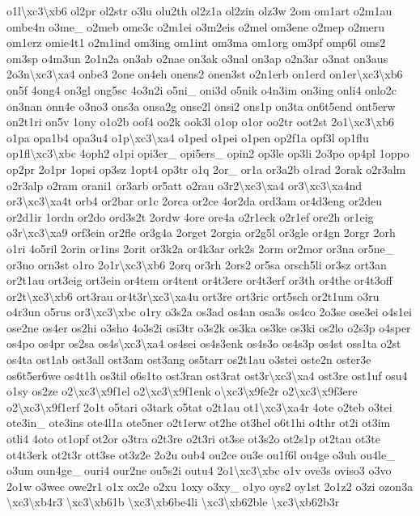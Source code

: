 \begin{DoxyCompactItemize}
o1l\textbackslash{}xc3\textbackslash{}xb6 ol2pr ol2str o3lu olu2th ol2z1a ol2zin olz3w 2om om1art o2m1au ombe4n o3me\-\_\- o2meb ome3c o2m1ei o3m2eis o2mel om3ene o2mep o2meru om1erz omie4t1 o2m1ind om3ing om1int om3ma om1org om3pf omp6l oms2 om3sp o4m3un 2o1n2a on3ab o2nae on3ak o3nal on3ap o2n3ar o3nat on3aus 2o3n\textbackslash{}xc3\textbackslash{}xa4 onbe3 2one on4eh onens2 onen3st o2n1erb on1erd on1er\textbackslash{}xc3\textbackslash{}xb6 on5f 4ong4 on3gl ong5sc 4o3n2i o5ni\-\_\- oni3d o5nik o4n3im on3ing onli4 onlo2c on3nan onn4e o3no3 ons3a onsa2g onse2l onsi2 ons1p on3ta on6t5end ont5erw on2t1ri on5v 1ony o1o2b oof4 oo2k ook3l o1op o1or oo2tr oot2st 2o1\textbackslash{}xc3\textbackslash{}xb6 o1pa opa1b4 opa3u4 o1p\textbackslash{}xc3\textbackslash{}xa4 o1ped o1pei o1pen op2f1a opf3l op1flu op1fl\textbackslash{}xc3\textbackslash{}xbc 4oph2 o1pi opi3er\-\_\- opi5ers\-\_\- opin2 op3le op3li 2o3po op4pl 1oppo op2pr 2o1pr 1opsi op3sz 1opt4 op3tr o1q 2or\-\_\- or1a or3a2b o1rad 2orak o2r3alm o2r3alp o2ram orani1 or3arb or5att o2rau o3r2\textbackslash{}xc3\textbackslash{}xa4 or3\textbackslash{}xc3\textbackslash{}xa4nd or3\textbackslash{}xc3\textbackslash{}xa4t orb4 or2bar or1c 2orca or2ce 4or2da ord3am or4d3eng or2deu or2d1ir 1ordn or2do ord3s2t 2ordw 4ore ore4a o2r1eck o2r1ef ore2h or1eig o3r\textbackslash{}xc3\textbackslash{}xa9 orf3ein or2fle or3g4a 2orget 2orgia or2g5l or3gle or4gn 2orgr 2orh o1ri 4o5ril 2orin or1ins 2orit or3k2a or4k3ar ork2s 2orm or2mor or3na or5ne\-\_\- or3no orn3st o1ro 2o1r\textbackslash{}xc3\textbackslash{}xb6 2orq or3rh 2ors2 or5sa orsch5li or3sz ort3an or2t1au ort3eig ort3ein or4tem or4tent or4t3ere or4t3erf or3th or4the or4t3off or2t\textbackslash{}xc3\textbackslash{}xb6 ort3rau or4t3r\textbackslash{}xc3\textbackslash{}xa4u ort3re ort3ric ort5sch or2t1um o3ru o4r3un o5rus or3\textbackslash{}xc3\textbackslash{}xbc o1ry o3s2a os3ad os4an osa3s os4co 2o3se ose3ei o4s1ei ose2ne os4er os2hi o3sho 4o3s2i osi3tr o3s2k os3ka os3ke os3ki os2lo o2s3p o4sper os4po os4pr os2sa os4s\textbackslash{}xc3\textbackslash{}xa4 os4sei os4s3enk os4s3o os4s3p os4st oss1ta o2st os4ta ost1ab ost3all ost3am ost3ang os5tarr os2t1au o3stei oste2n oster3e os6t5er6we os4t1h os3til o6s1to ost3ran ost3rat ost3r\textbackslash{}xc3\textbackslash{}xa4 ost3re ost1uf osu4 o1sy os2ze o2\textbackslash{}xc3\textbackslash{}x9f1el o2\textbackslash{}xc3\textbackslash{}x9f1enk o\textbackslash{}xc3\textbackslash{}x9fe2r o2\textbackslash{}xc3\textbackslash{}x9f3ere o2\textbackslash{}xc3\textbackslash{}x9f1erf 2o1t o5tari o3tark o5tat o2t1au ot1\textbackslash{}xc3\textbackslash{}xa4r 4ote o2teb o3tei ote3in\-\_\- ote3ins ote4l1a ote5ner o2t1erw ot2he ot3hel o6t1hi o4thr ot2i ot3im otli4 4oto ot1opf ot2or o3tra o2t3re o2t3ri ot3se ot3s2o ot2s1p ot2tau ot3te ot4t3erk ot2t3r ott3se ot3z2e 2o2u oub4 ou2ce ou3e ou1f6l ou4ge o3uh ou4le\-\_\- o3um oun4ge\-\_\- ouri4 our2ne ou5s2i outu4 2o1\textbackslash{}xc3\textbackslash{}xbc o1v ove3s oviso3 o3vo 2o1w o3wec owe2r1 o1x ox2e o2xu 1oxy o3xy\-\_\- o1yo oys2 oy1st 2o1z2 o3zi ozon3a \textbackslash{}xc3\textbackslash{}xb4r3 \textbackslash{}xc3\textbackslash{}xb61b \textbackslash{}xc3\textbackslash{}xb6be4li \textbackslash{}xc3\textbackslash{}xb62ble \textbackslash{}xc3\textbackslash{}xb62b3r 
\end{DoxyCompactItemize}

